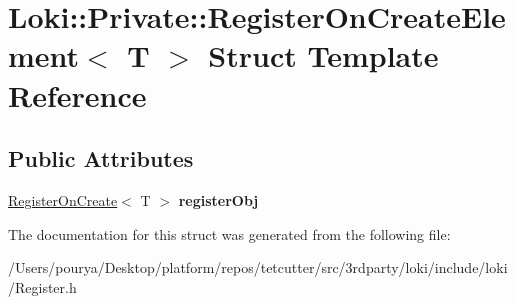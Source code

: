 \hypertarget{structLoki_1_1Private_1_1RegisterOnCreateElement}{}\section{Loki\+:\+:Private\+:\+:Register\+On\+Create\+Element$<$ T $>$ Struct Template Reference}
\label{structLoki_1_1Private_1_1RegisterOnCreateElement}
\subsection*{Public Attributes}
\begin{DoxyCompactItemize}
\item 
\hypertarget{structLoki_1_1Private_1_1RegisterOnCreateElement_a9a753d5c7282524ab5e110e8d65bf569}{}\hyperlink{structLoki_1_1Private_1_1RegisterOnCreate}{Register\+On\+Create}$<$ T $>$ {\bfseries register\+Obj}\label{structLoki_1_1Private_1_1RegisterOnCreateElement_a9a753d5c7282524ab5e110e8d65bf569}

\end{DoxyCompactItemize}


The documentation for this struct was generated from the following file\+:\begin{DoxyCompactItemize}
\item 
/\+Users/pourya/\+Desktop/platform/repos/tetcutter/src/3rdparty/loki/include/loki/Register.\+h\end{DoxyCompactItemize}
